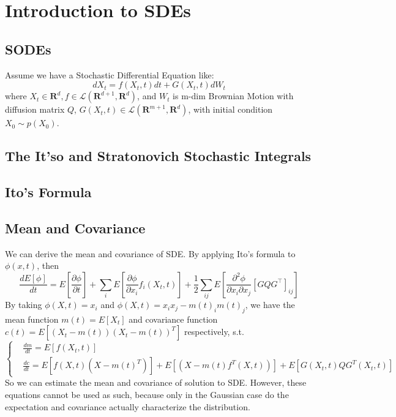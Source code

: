 \section{Introduction to SDEs}
\subsection{SODEs}
\begin{problem}
    Assume we have a Stochastic Differential Equation like:
    \begin{equation}\label{sde}
        dX_t = f(X_t, t)dt + G(X_t, t)dW_t
    \end{equation}
    where $X_t\in \mathbf{R}^d,f\in \mathcal{L}(\mathbf{R}^{d+1}, \mathbf{R}^d)$, and $W_t$ is m-dim Brownian Motion with diffusion matrix $Q$, 
    $G(X_t, t)\in \mathcal{L}(\mathbf{R}^{m+1}, \mathbf{R}^d)$, with initial condition $X_0\sim p(X_0)$.
\end{problem}
\subsection{The It'so and Stratonovich Stochastic Integrals}
\subsection{Ito's Formula}

\subsection{Mean and Covariance}
We can derive the mean and covariance of SDE.
By applying Ito's formula to $\phi(x, t)$, then
\begin{equation}
    \frac{d E[\phi]}{d t}=E\left[\frac{\partial \phi}{\partial t}\right]+\sum_{i} E\left[\frac{\partial \phi}{\partial x_{i}} f_{i}(X_t, t)\right]+\frac{1}{2} \sum_{i j} E\left[\frac{\partial^{2} \phi}{\partial x_{i} \partial x_{j}}\left[G Q G^{\top}\right]_{i j}\right]
\end{equation}
By taking $\phi(X, t)=x_i$ and $\phi(X, t)=x_ix_j-m(t)_im(t)_j$, we have the mean function $m(t)=E[X_t]$ 
and covariance function $c(t)=E\left[\left(X_t-m(t)\right)\left(X_t-m(t)\right)^T\right]$ respectively, s.t.
\begin{equation}\label{SDEMC}
    \left\{
        \begin{aligned}
            &\frac{d m}{d t}=E\left[f(X_t, t)\right]\\
            &\frac{d c}{d t}=E\left[f(X, t)(X-m(t)^T)\right]+E\left[(X-m(t)f^T(X, t))\right]+E\left[G(X_t, t)QG^T(X_t, t)\right]
        \end{aligned}
    \right.
\end{equation}
So we can estimate the mean and covariance of solution to SDE. However, these equations cannot be used as such, 
because only in the Gaussian case do the expectation and covariance actually characterize the distribution. 

